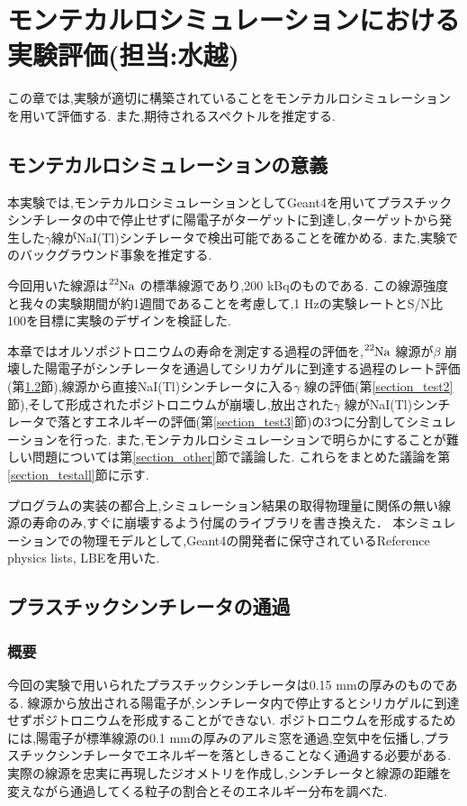 \chapter{モンテカルロシミュレーションにおける実験評価(担当:水越)}\label{simulation}

この章では,実験が適切に構築されていることをモンテカルロシミュレーションを用いて評価する.
また,期待されるスペクトルを推定する.

\section{モンテカルロシミュレーションの意義}

本実験では,モンテカルロシミュレーションとしてGeant4\cite{geant4}を用いてプラスチックシンチレータの中で停止せずに陽電子がターゲットに到達し,ターゲットから発生した$\gamma$線がNaI(Tl)シンチレータで検出可能であることを確かめる.
また,実験でのバックグラウンド事象を推定する.

今回用いた線源は$\ce{^{22}Na}$ の標準線源であり,200 kBqのものである.
この線源強度と我々の実験期間が約1週間であることを考慮して,1 Hzの実験レートとS/N比100を目標に実験のデザインを検証した.


本章ではオルソポジトロニウムの寿命を測定する過程の評価を,$\ce{^{22}Na}$ 線源が$\beta$ 崩壊した陽電子がシンチレータを通過してシリカゲルに到達する過程のレート評価(第\ref{section_test1}節),線源から直接NaI(Tl)シンチレータに入る$\gamma$ 線の評価(第\ref{section_test2}節),そして形成されたポジトロニウムが崩壊し,放出された$\gamma$ 線がNaI(Tl)シンチレータで落とすエネルギーの評価(第\ref{section_test3}節)の3つに分割してシミュレーションを行った.
また,モンテカルロシミュレーションで明らかにすることが難しい問題については第\ref{section_other}節で議論した.
これらをまとめた議論を第\ref{section_testall}節に示す.

プログラムの実装の都合上,シミュレーション結果の取得物理量に関係の無い線源の寿命のみ,すぐに崩壊するよう付属のライブラリを書き換えた．
本シミュレーションでの物理モデルとして,Geant4の開発者に保守されているReference physics lists, LBEを用いた.

\section{プラスチックシンチレータの通過}
\label{section_test1}

\subsection{概要}
今回の実験で用いられたプラスチックシンチレータは0.15 mmの厚みのものである.
線源から放出される陽電子が,シンチレータ内で停止するとシリカゲルに到達せずポジトロニウムを形成することができない.
ポジトロニウムを形成するためには,陽電子が標準線源の0.1 mmの厚みのアルミ窓を通過,空気中を伝播し,プラスチックシンチレータでエネルギーを落としきることなく通過する必要がある.
実際の線源を忠実に再現したジオメトリを作成し,シンチレータと線源の距離を変えながら通過してくる粒子の割合とそのエネルギー分布を調べた.



